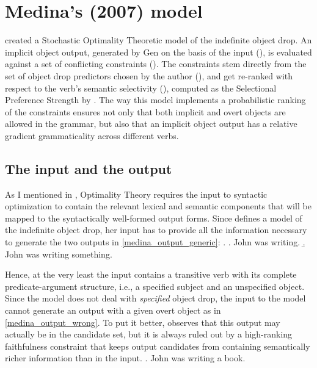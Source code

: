 \setchapterpreamble[u]{\margintoc}
\chapter{Medina's (2007) model}


\textcite{Medina2007} created a Stochastic Optimality Theoretic model of the indefinite object drop. An implicit object output, generated by Gen on the basis of the input (), is evaluated against a set of conflicting constraints (). The constraints stem directly from the set of object drop predictors chosen by the author (), and get re-ranked with respect to the verb's semantic selectivity (), computed as the Selectional Preference Strength by \textcite{Resnik1993, Resnik1996}. The way this model implements a probabilistic ranking of the constraints ensures not only that both implicit and overt objects are allowed in the grammar, but also that an implicit object output has a relative gradient grammaticality across different verbs.


\section{The input and the output} 

As I mentioned in , Optimality Theory requires the input to syntactic optimization to contain the relevant lexical and semantic components that will be mapped to the syntactically well-formed output forms. Since \textcite{Medina2007} defines a model of the indefinite object drop, her input has to provide all the information necessary to generate the two outputs in  \ref{medina_output_generic}:
\ex. \label{medina_output_generic} \a. John was writing.
\b. John was writing something.

Hence, at the very least the input contains a transitive verb with its complete predicate-argument structure, i.e., a specified subject and an unspecified object. Since the model does not deal with \textit{specified} object drop, the input to the model cannot generate an output with a given overt object as in \ref{medina_output_wrong}. To put it better, \textcite[70-71]{Medina2007} observes that this output may actually be in the candidate set, but it is always ruled out by a high-ranking faithfulness constraint that keeps output candidates from containing semantically richer information than in the input.
\ex. \label{medina_output_wrong} John was writing a book.

